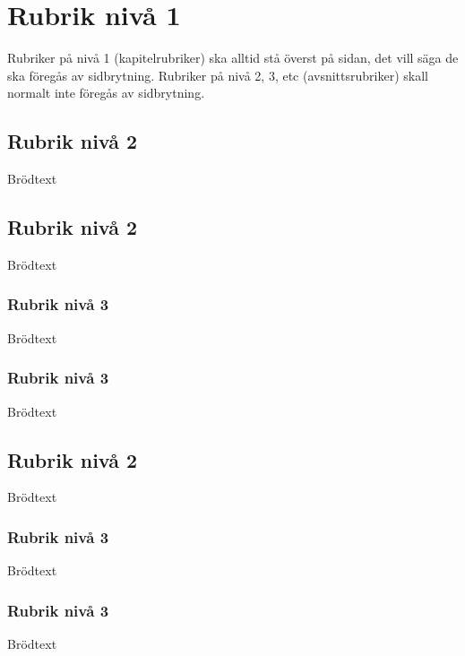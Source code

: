 \chapter{Rubrik nivå 1}
Rubriker på nivå 1 (kapitelrubriker) ska alltid stå överst på sidan, det
vill säga de ska föregås av sidbrytning. Rubriker på nivå 2, 3, etc
(avsnittsrubriker) skall normalt inte föregås av sidbrytning. 

\section{Rubrik nivå 2}
Brödtext

\section{Rubrik nivå 2}
Brödtext

\subsection{Rubrik nivå 3}
Brödtext

\subsection{Rubrik nivå 3}
Brödtext

\section{Rubrik nivå 2}
Brödtext

\subsection{Rubrik nivå 3}
Brödtext

\subsection{Rubrik nivå 3}
Brödtext
